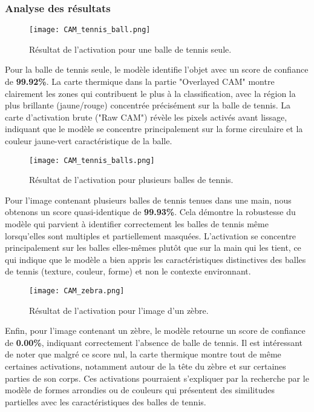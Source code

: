 \subsubsection{Analyse des résultats}
\begin{figure}[H]
    \centering
    \texttt{[image: CAM\_tennis\_ball.png]}
    \caption{Résultat de l'activation pour une balle de tennis seule.}
\end{figure}
Pour la balle de tennis seule, le modèle identifie l'objet avec un score de confiance de \textbf{99.92\%}. La carte thermique dans la partie "Overlayed CAM" montre clairement les zones qui contribuent le plus à la classification, avec la région la plus brillante (jaune/rouge) concentrée précisément sur la balle de tennis. La carte d'activation brute ("Raw CAM") révèle les pixels activés avant lissage, indiquant que le modèle se concentre principalement sur la forme circulaire et la couleur jaune-vert caractéristique de la balle.

\begin{figure}[H]
    \centering
    \texttt{[image: CAM\_tennis\_balls.png]}
    \caption{Résultat de l'activation pour plusieurs balles de tennis.}
\end{figure}
Pour l'image contenant plusieurs balles de tennis tenues dans une main, nous obtenons un score quasi-identique de \textbf{99.93\%}. Cela démontre la robustesse du modèle qui parvient à identifier correctement les balles de tennis même lorsqu'elles sont multiples et partiellement masquées. L'activation se concentre principalement sur les balles elles-mêmes plutôt que sur la main qui les tient, ce qui indique que le modèle a bien appris les caractéristiques distinctives des balles de tennis (texture, couleur, forme) et non le contexte environnant.

\begin{figure}[H]
    \centering
    \texttt{[image: CAM\_zebra.png]}
    \caption{Résultat de l'activation pour l'image d'un zèbre.}
\end{figure}
Enfin, pour l'image contenant un zèbre, le modèle retourne un score de confiance de \textbf{0.00\%}, indiquant correctement l'absence de balle de tennis. Il est intéressant de noter que malgré ce score nul, la carte thermique montre tout de même certaines activations, notamment autour de la tête du zèbre et sur certaines parties de son corps. Ces activations pourraient s'expliquer par la recherche par le modèle de formes arrondies ou de couleurs qui présentent des similitudes partielles avec les caractéristiques des balles de tennis.

